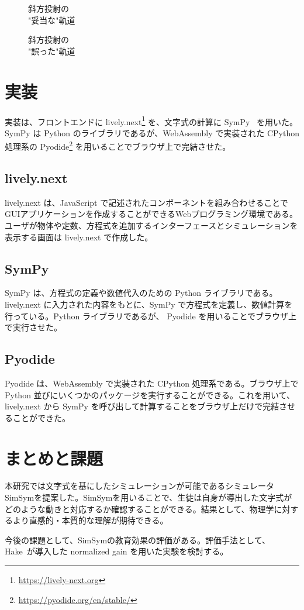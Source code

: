 \documentclass[11pt, a4paper, oneside, twocolumn, dvipdfmx]{jsarticle}
\newcommand{\simname}{SimSym}
\begin{document}
\begin{figure}[htb]
\centering
\begin{minipage}{0.4\linewidth}
\centering
{}
\caption{斜方投射の\\"妥当な"軌道} \label{correct}
\end{minipage}
\begin{minipage}{0.4\linewidth}
\centering
{}
\caption{斜方投射の\\"誤った"軌道} \label{wrong}
\end{minipage}
\end{figure}

\section{実装}
実装は、フロントエンドに lively.next\footnote{\url{https://lively-next.org}} を、文字式の計算に SymPy~\cite{meurer_sympy_2017} を用いた。SymPy は Python のライブラリであるが、WebAssembly で実装された CPython 処理系の Pyodide\footnote{\url{https://pyodide.org/en/stable/}} を用いることでブラウザ上で完結させた。

\subsection*{lively.next}
lively.next は、JavaScript で記述されたコンポーネントを組み合わせることでGUIアプリケーションを作成することができるWebプログラミング環境である。ユーザが物体や定数、方程式を追加するインターフェースとシミュレーションを表示する画面は lively.next で作成した。

\subsection*{SymPy}
SymPy は、方程式の定義や数値代入のための Python ライブラリである。lively.next に入力された内容をもとに、SymPy で方程式を定義し、数値計算を行っている。Python ライブラリであるが、 Pyodide を用いることでブラウザ上で実行させた。

\subsection{Pyodide}
Pyodide は、WebAssembly で実装された CPython 処理系である。ブラウザ上で Python 並びにいくつかのパッケージを実行することができる。これを用いて、lively.next から SymPy を呼び出して計算することをブラウザ上だけで完結させることができた。

\section{まとめと課題}
本研究では文字式を基にしたシミュレーションが可能であるシミュレータ \simname を提案した。\simname を用いることで、生徒は自身が導出した文字式がどのような動きと対応するか確認することができる。結果として、物理学に対するより直感的・本質的な理解が期待できる。

今後の課題として、\simname の教育効果の評価がある。評価手法として、Hake~\cite{hake_1998}が導入した normalized gain を用いた実験を検討する。



\end{document}
